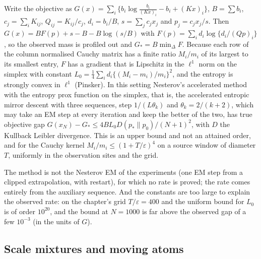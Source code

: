 \begin{remark}\label{qt:rem:accelerated}
Write the objective as $G(x)=\sum_i\{b_i\log\frac{b_i}{(Kx)_i}-b_i+(Kx)_i\}$, $B=\sum b_i$, $c_j=\sum_iK_{ij}$, $Q_{ij}=K_{ij}/c_j$, $d_i=b_i/B$, $s=\sum_jc_jx_j$ and $p_j=c_jx_j/s$. Then $G(x)=BF(p)+s-B-B\log(s/B)$ with $F(p)=\sum_id_i\log\{d_i/(Qp)_i\}$, so the observed mass is profiled out and $G_*=B\min_{\Delta}F$. Because each row of the column normalised Cauchy matrix has a finite ratio $M_i/m_i$ of its largest to its smallest entry, $F$ has a gradient that is Lipschitz in the $\ell^1$ norm on the simplex with constant $L_0=\tfrac14\sum_id_i\{(M_i-m_i)/m_i\}^2$, and the entropy is strongly convex in $\ell^1$ (Pinsker). In this setting Nesterov's accelerated method with the entropy prox function on the simplex, %
that is, the accelerated entropic mirror descent with three sequences, step $1/(L\theta_k)$ and $\theta_k=2/(k+2)$, which may take an EM step at every iteration and keep the better of the two, has true objective gap $G(x_N)-G_*\le4BL_0D(p_*\|p_0)/(N+1)^2$, with $D$ the Kullback Leibler divergence. This is an upper bound and not an attained order, and for the Cauchy kernel $M_i/m_i\le(1+T/\varepsilon)^4$ on a source window of diameter $T$, uniformly in the observation sites and the grid.

The method is not the Nesterov EM of the experiments (one EM step from a clipped extrapolation, with restart), for which no rate is proved; the rate comes entirely from the auxiliary sequence. And the constants are too large to explain the observed rate: on the chapter's grid $T/\varepsilon=400$ and the uniform bound for $L_0$ is of order $10^{20}$, and the bound at $N=1000$ is far above the observed gap of a few $10^{-3}$ (in the units of $G$).
\end{remark}

\subsection{Scale mixtures and moving atoms}\label{qt:sec:mix}


